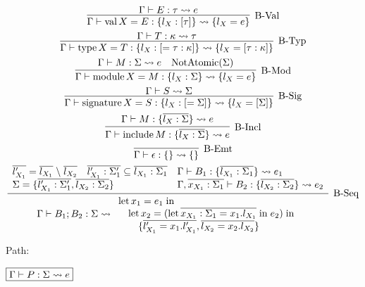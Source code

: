 \begin{gather*}
  \infer[\text{B-Val}]{\Gamma \vdash \symval X = E: \{l_X: [\tau]\} \elaborate \{l_X = e\}}{
    \Gamma \vdash E: \tau \elaborate e
  }
  \\
  \infer[\text{B-Typ}]{\Gamma \vdash \symtype X = T: \{l_X: [= \tau: \kappa]\} \elaborate \{l_X = [\tau: \kappa]\}}{
    \Gamma \vdash T: \kappa \elaborate \tau
  }
  \\
  \infer[\text{B-Mod}]{\Gamma \vdash \symmodule X = M: \{l_X: \Sigma\} \elaborate \{l_X = e\}}{
    \Gamma \vdash M: \Sigma \elaborate e
    &
    \symNotAtomic(\Sigma)
  }
  \\
  \infer[\text{B-Sig}]{\Gamma \vdash \symsignature X = S: \{l_X: [= \Sigma]\} \elaborate \{l_X = [\Sigma]\}}{
    \Gamma \vdash S \elaborate \Sigma
  }
  \\
  \infer[\text{B-Incl}]{\Gamma \vdash \syminclude M: \{\overline{l_X: \Sigma}\} \elaborate e}{
    \Gamma \vdash M: \{\overline{l_X: \Sigma}\} \elaborate e
  }
  \\
  \infer[\text{B-Emt}]{\Gamma \vdash \epsilon: \{\} \elaborate \{\}}{}
  \\
  \infer[\text{B-Seq}]{
    \Gamma \vdash B_1; B_2: \Sigma \elaborate
    \begin{array}{l}
      \symlet x_1 = e_1 \symin \\
      \hspace{1em}\symlet x_2 = (\symlet \overline{x_{X_1}: \Sigma_1 = x_1.l_{X_1}} \symin e_2) \symin \\
      \hspace{2em}\{\overline{l'_{X_1} = x_1.l'_{X_1}}, \overline{l_{X_2} = x_2.l_{X_2}}\}
    \end{array}
  }{
    \begin{array}{lll}
      \overline{l'_{X_1}} = \overline{l_{X_1}} \rcomplement \overline{l_{X_2}}
      &
      \overline{l'_{X_1}: \Sigma'_1} \subseteq \overline{l_{X_1}: \Sigma_1}
      &
      \Gamma \vdash B_1: \{\overline{l_{X_1}: \Sigma_1}\} \elaborate e_1
      \\
      \multicolumn{2}{l}{\Sigma = \{\overline{l'_{X_1}: \Sigma'_1}, \overline{l_{X_2}: \Sigma_2}\}}
      &
      \Gamma, \overline{x_{X_1}: \Sigma_1} \vdash B_2: \{\overline{l_{X_2}: \Sigma_2}\} \elaborate e_2
    \end{array}
  }
\end{gather*}

Path:

$\fbox{$\Gamma \vdash P: \Sigma \rightsquigarrow e$}$

